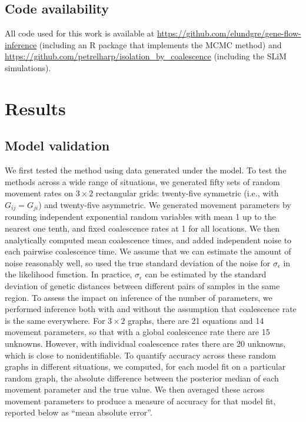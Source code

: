 \documentclass{article}
\begin{document}
\subsection*{Code availability}

All code used for this work is available at \url{https://github.com/elundgre/gene-flow-inference}
(including an R package that implements the MCMC method)
and \url{https://github.com/petrelharp/isolation_by_coalescence} (including the SLiM simulations).


\section*{Results}



\subsection*{Model validation}

We first tested the method using data generated under the model.
To test the methods across a wide range of situations,
we generated fifty sets of random movement rates on $3 \times 2$ rectangular grids:
twenty-five symmetric (i.e., with $G_{ij} = G_{ji}$) and twenty-five asymmetric.
We generated movement parameters
by rounding independent exponential random variables with mean 1 up to the nearest one tenth, 
and fixed coalescence rates at 1 for all locations.
We then analytically computed mean coalescence times,
and added independent noise to each pairwise coalescence time.
We assume that we can estimate the amount of noise reasonably well, 
so used the true standard deviation of the noise for $\sigma_\epsilon$ in the likelihood function.
In practice, $\sigma_\epsilon$ can be estimated by the standard deviation
of genetic distances between different pairs of samples in the same region.
To assess the impact on inference of the number of parameters,
we performed inference both with and without the assumption 
that coalescence rate is the same everywhere.
For $3 \times 2$ graphs, there are 21 equations
and 14 movement parameters,
so that with a global coalescence rate there are 15 unknowns.
However, with individual coalescence rates there are 20 unknowns,
which is close to nonidentifiable.
To quantify accuracy across these random graphs in different situations,
we computed, for each model fit on a particular random graph,
the absolute difference between the posterior median of each movement parameter
and the true value.
We then averaged these across movement parameters to produce a measure of accuracy for that model fit,
reported below as ``mean absolute error''.
\end{document}
